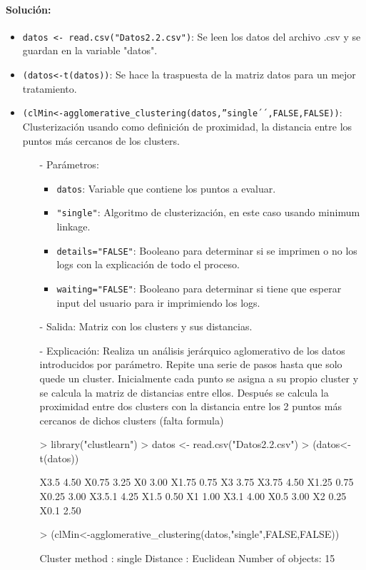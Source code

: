 \documentclass[a4paper, 12pt]{article}
\begin{document}
	\paragraph{Solución:}
	\begin{itemize}
		\item \texttt{datos <- read.csv("Datos2.2.csv")}: Se leen los datos del archivo .csv y se guardan en la variable "datos".
		\item \texttt{(datos<-t(datos))}: Se hace la traspuesta de la matriz datos para un mejor tratamiento.
		\item \texttt{(clMin<-agglomerative\_clustering(datos,''single´´,FALSE,FALSE))}: Clusterización usando como definición de proximidad, la distancia entre los puntos más cercanos de los clusters.
		\begin{itemize}
			\item [-] Parámetros:
			\begin{itemize}
				\item \texttt{datos}: Variable que contiene los puntos a evaluar.
				\item \texttt{"single"}: Algoritmo de clusterización, en este caso usando minimum linkage.
				\item \texttt{details="FALSE"}: Booleano para determinar si se imprimen o no los logs con la explicación de todo el proceso.
				\item \texttt{waiting="FALSE"}: Booleano para determinar si tiene que esperar input del usuario para ir imprimiendo los logs.
			\end{itemize}
			\item [-] Salida: Matriz con los clusters y sus distancias.
			\item [-] Explicación: Realiza un análisis jerárquico aglomerativo de los datos introducidos por parámetro. Repite una serie de pasos hasta que solo quede un cluster. Inicialmente cada punto se asigna a su propio cluster y se calcula la matriz de distancias entre ellos. Después se calcula la proximidad entre dos clusters con la distancia entre los 2 puntos más cercanos de dichos clusters (falta formula)
\begin{Schunk}
\begin{Sinput}
> library("clustlearn")
> datos <- read.csv("Datos2.2.csv")
> (datos<-t(datos))
\end{Sinput}
\begin{Soutput}
       [,1]
X3.5   4.50
X0.75  3.25
X0     3.00
X1.75  0.75
X3     3.75
X3.75  4.50
X1.25  0.75
X0.25  3.00
X3.5.1 4.25
X1.5   0.50
X1     1.00
X3.1   4.00
X0.5   3.00
X2     0.25
X0.1   2.50
\end{Soutput}
\begin{Sinput}
> (clMin<-agglomerative_clustering(datos,"single",FALSE,FALSE))
\end{Sinput}
\begin{Soutput}
Cluster method   : single 
Distance         : Euclidean 
Number of objects: 15 
\end{Soutput}
\end{Schunk}
		\end{itemize}
		

\end{itemize}
\end{document}
